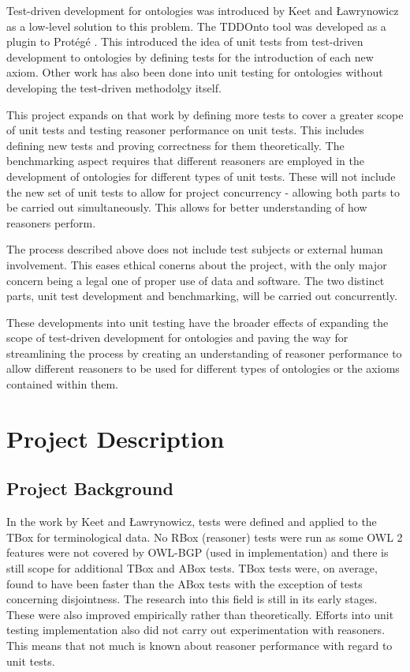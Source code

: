 \documentclass[draft]{sig-alternate}
\begin{document}
Test-driven development for ontologies was introduced by Keet and {\L}awrynowicz \cite{DBLP:journals/corr/KeetL15} as a low-level solution to this problem. The TDDOnto tool was developed as a plugin to Prot\'eg\'e \cite{DBLP:conf/dlog/LawrynowiczK16}. This introduced the idea of unit tests from test-driven development to ontologies by defining tests for the introduction of each new axiom. Other work has also been done into unit testing for ontologies without developing the test-driven methodolgy itself.

This project expands on that work by defining more tests to cover a greater scope of unit tests and testing reasoner performance on unit tests. This includes defining new tests and proving correctness for them theoretically. The benchmarking aspect requires that different reasoners are employed in the development of ontologies for different types of unit tests. These will not include the new set of unit tests to allow for project concurrency - allowing both parts to be carried out simultaneously. This allows for better understanding of how reasoners perform. 

The process described above does not include test subjects or external human involvement. This eases ethical conerns about the project, with the only major concern being a legal one of proper use of data and software. The two distinct parts, unit test development and benchmarking, will be carried out concurrently.

These developments into unit testing have the broader effects of expanding the scope of test-driven development for ontologies and paving the way for streamlining the process by creating an understanding of reasoner performance to allow different reasoners to be used for different types of ontologies or the axioms contained within them.

\section{Project Description}

\subsection{Project Background}

In the work by Keet and {\L}awrynowicz, tests were defined and applied to the TBox for terminological data. No RBox (reasoner) tests were run as some OWL 2 features were not covered by OWL-BGP (used in implementation) and there is still scope for additional TBox and ABox tests. TBox tests were, on average, found to have been faster than the ABox tests with the exception of tests concerning disjointness\cite{DBLP:journals/corr/KeetL15}. The research into this field is still in its early stages. These were also improved empirically rather than theoretically. Efforts into unit testing implementation \cite{DBLP:conf/owled/GrimmM05,DBLP:conf/dlog/LawrynowiczK16,SconeUserGuide,DBLP:journals/corr/WarrenderL15} also did not carry out experimentation with reasoners. This means that not much is known about reasoner performance with regard to unit tests.
\end{document}
